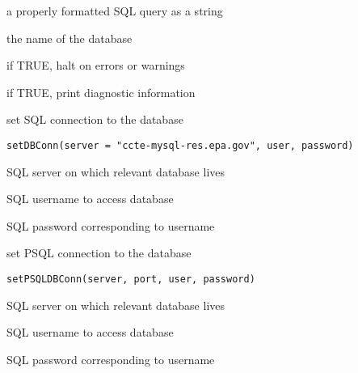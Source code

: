 \documentclass[letterpaper]{book}
\begin{document}
%
\begin{Arguments}
\begin{ldescription}
\item[\code{query}] a properly formatted SQL query as a string

\item[\code{db}] the name of the database

\item[\code{do.halt}] if TRUE, halt on errors or warnings

\item[\code{verbose}] if TRUE, print diagnostic information
\end{ldescription}
\end{Arguments}
%
\begin{Description}\relax
set SQL connection to the database
\end{Description}
%
\begin{Usage}
\begin{verbatim}
setDBConn(server = "ccte-mysql-res.epa.gov", user, password)
\end{verbatim}
\end{Usage}
%
\begin{Arguments}
\begin{ldescription}
\item[\code{server}] SQL server on which relevant database lives

\item[\code{user}] SQL username to access database

\item[\code{password}] SQL password corresponding to username
\end{ldescription}
\end{Arguments}
%
\begin{Description}\relax
set PSQL connection to the database
\end{Description}
%
\begin{Usage}
\begin{verbatim}
setPSQLDBConn(server, port, user, password)
\end{verbatim}
\end{Usage}
%
\begin{Arguments}
\begin{ldescription}
\item[\code{server}] SQL server on which relevant database lives

\item[\code{user}] SQL username to access database

\item[\code{password}] SQL password corresponding to username
\end{ldescription}
\end{Arguments}
\end{document}
